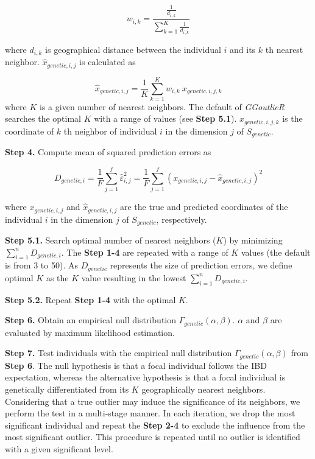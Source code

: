 \documentclass[11pt]{article}
\begin{document}
\begin{equation} \label{w_eq1}
w_{i,k}=\frac{\frac{1}{d_{i,k}}}{\sum_{k=1}^{K} \frac{1}{d_{i,k}}}
\end{equation}

where $d_{i,k}$ is geographical distance between the individual $i$ and its $k$ th nearest neighbor.
$\hat{x}_{genetic,i,j}$ is calculated as

\begin{equation} \label{wknn_eq1}
\hat{x}_{genetic,i,j}=\frac{1}{K}\sum_{k=1}^{K}w_{i,k}\ x_{genetic,i,j,k}
\end{equation}
where $K$ is a given number of nearest neighbors. 
The default of \textit{GGoutlieR} searches the optimal $K$ with a range of values (see \textbf{Step 5.1}).
$x_{genetic,i,j,k}$ is the coordinate of $k$ th neighbor of individual $i$ in the dimension $j$ of $S_{genetic}$.

\textbf{Step 4.} Compute mean of squared prediction errors as

\begin{equation} \label{Dg_eq}
D_{genetic, i}=\frac{1}{F}\sum_{j=1}^{f} \hat{\varepsilon}_{i,j}^2 =\frac{1}{F}\sum_{j=1}^{f} (x_{genetic,i,j} - \hat{x}_{genetic,i,j})^2
\end{equation}

where $x_{genetic,i,j}$ and $\hat{x}_{genetic,i,j}$ are the true and predicted coordinates of the individual $i$ in the dimension $j$ of $S_{genetic}$, respectively.

\textbf{Step 5.1.} Search optimal number of nearest neighbors ($K$) by minimizing $\sum_{i=1}^{n}D_{genetic,i}$. 
The \textbf{Step 1-4} are repeated with a range of $K$ values (the default is from 3 to 50).
As $D_{genetic}$ represents the size of prediction errors, we define optimal $K$ as the $K$ value resulting in the lowest $\sum_{i=1}^{n}D_{genetic,i}$.


\textbf{Step 5.2.} Repeat \textbf{Step 1-4} with the optimal $K$.

\textbf{Step 6.} Obtain an empirical null distribution $\Gamma_{genetic}(\alpha,\beta)$. $\alpha$ and $\beta$ are evaluated by maximum likelihood estimation.

\textbf{Step 7.} Test individuals with the empirical null distribution $\Gamma_{genetic}(\alpha,\beta)$ from \textbf{Step 6}. The null hypothesis is that a focal individual follows the IBD expectation, whereas the alternative hypothesis is that a focal individual is genetically differentiated from its $K$ geographically nearest neighbors.
Considering that a true outlier may induce the significance of its neighbors, we perform the test in a multi-stage manner.
In each iteration, we drop the most significant individual and repeat the \textbf{Step 2-4} to exclude the influence from the most significant outlier.
This procedure is repeated until no outlier is identified with a given significant level.
\end{document}
